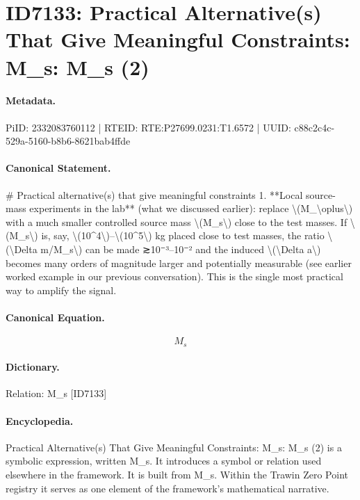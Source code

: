 \section*{ID7133: Practical Alternative(s) That Give Meaningful Constraints: M\_s: M\_s (2)}
\paragraph{Metadata.}
PiID: 2332083760112 | RTEID: RTE:P27699.0231:T1.6572 | UUID: c88c2c4c-529a-5160-b8b6-8621bab4ffde

\paragraph{Canonical Statement.}
\# Practical alternative(s) that give meaningful constraints 1. **Local source-mass experiments in the lab** (what we discussed earlier): replace \textbackslash{}(M\_\textbackslash{}oplus\textbackslash{}) with a much smaller controlled source mass \textbackslash{}(M\_s\textbackslash{}) close to the test masses. If \textbackslash{}(M\_s\textbackslash{}) is, say, \textbackslash{}(10\textasciicircum{}4\textbackslash{})–\textbackslash{}(10\textasciicircum{}5\textbackslash{}) kg placed close to test masses, the ratio \textbackslash{}(\textbackslash{}Delta m/M\_s\textbackslash{}) can be made ≳10⁻³–10⁻² and the induced \textbackslash{}(\textbackslash{}Delta a\textbackslash{}) becomes many orders of magnitude larger and potentially measurable (see earlier worked example in our previous conversation). This is the single most practical way to amplify the signal.

\paragraph{Canonical Equation.}
\[
M_s
\]

\paragraph{Dictionary.}
Relation: M\_s [ID7133]

\paragraph{Encyclopedia.}
Practical Alternative(s) That Give Meaningful Constraints: M\_s: M\_s (2) is a symbolic expression, written M\_s. It introduces a symbol or relation used elsewhere in the framework. It is built from M\_s. Within the Trawin Zero Point registry it serves as one element of the framework's mathematical narrative.
